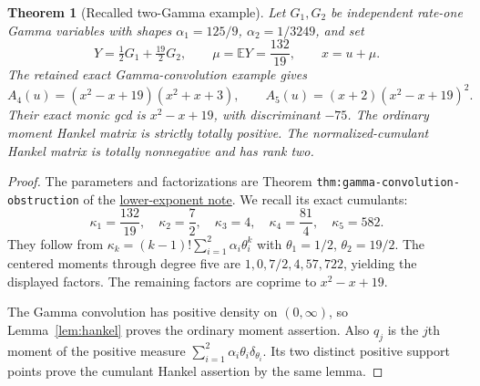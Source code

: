\documentclass[11pt]{article}
\newtheorem{theorem}{Theorem}
\newcommand{\E}{\mathbb E}
\begin{document}
\begin{theorem}[Recalled two-Gamma example]\label{thm:finite-obstruction}
Let $G_1,G_2$ be independent rate-one Gamma variables with shapes
$\alpha_1=125/9$, $\alpha_2=1/3249$, and set
\[
 Y=\tfrac12G_1+\tfrac{19}2G_2,\qquad
 \mu=\E Y=\frac{132}{19},\qquad x=u+\mu.
\]
The retained exact Gamma-convolution example gives
\[
 A_4(u)=(x^2-x+19)(x^2+x+3),\qquad
 A_5(u)=(x+2)(x^2-x+19)^2.
\]
Their exact monic gcd is $x^2-x+19$, with discriminant $-75$.
The ordinary moment Hankel matrix is strictly totally positive.
The normalized-cumulant Hankel matrix is totally nonnegative
and has rank two.
\end{theorem}
\begin{proof}
The parameters and factorizations are
Theorem \texttt{thm:gamma-convolution-obstruction} of the
\href{lower_exponent_initial_and_boundary.tex}{lower-exponent note}.
We recall its exact cumulants:
\[
 \kappa_1=\frac{132}{19},\quad
 \kappa_2=\frac72,\quad \kappa_3=4,\quad
 \kappa_4=\frac{81}4,\quad \kappa_5=582.
\]
They follow from
$\kappa_k=(k-1)!\sum_{i=1}^2\alpha_i\theta_i^k$ with
$\theta_1=1/2$, $\theta_2=19/2$.
The centered moments through degree five are
$1,0,7/2,4,57,722$, yielding the displayed factors.
The remaining factors are coprime to $x^2-x+19$.

The Gamma convolution has positive density on $(0,\infty)$, so
Lemma~\ref{lem:hankel} proves the ordinary moment assertion.
Also $q_j$ is the $j$th moment of the positive measure
$\sum_{i=1}^2\alpha_i\theta_i\delta_{\theta_i}$.
Its two distinct positive support points prove the cumulant
Hankel assertion by the same lemma.
\end{proof}
\end{document}
